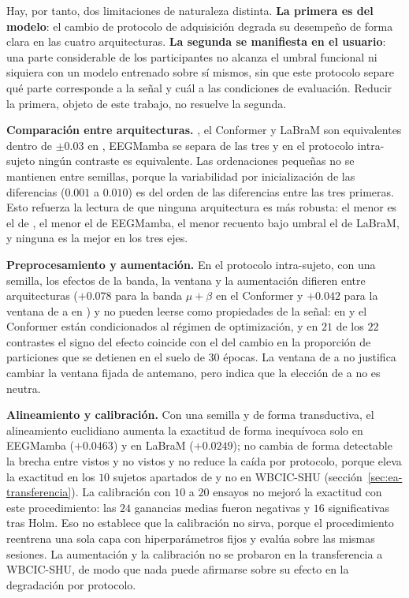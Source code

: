 Hay, por tanto, dos limitaciones de naturaleza distinta. \textbf{La primera es del modelo}: el cambio de
protocolo de adquisición degrada su desempeño de forma clara en las cuatro arquitecturas. \textbf{La segunda se
manifiesta en el usuario}: una parte considerable de los participantes no alcanza el umbral funcional ni
siquiera con un modelo entrenado sobre sí mismos, sin que este protocolo separe qué parte corresponde a la
señal y cuál a las condiciones de evaluación. Reducir la primera, objeto de este trabajo, no resuelve la
segunda.

\textbf{Comparación entre arquitecturas.} \eegnet{}, el Conformer y LaBraM son equivalentes dentro de $\pm 0.03$
en \loso{}, EEGMamba se separa de las tres y en el protocolo intra-sujeto ningún contraste es equivalente.
Las ordenaciones pequeñas no se mantienen entre semillas, porque la variabilidad por inicialización de las
diferencias ($0.001$ a $0.010$) es del orden de las diferencias entre las tres primeras. Esto refuerza la
lectura de que ninguna arquitectura es más robusta: el menor \dsi{} es el de \eegnet{}, el menor \idp{} el de
EEGMamba, el menor recuento bajo umbral el de LaBraM, y ninguna es la mejor en los tres ejes.

\textbf{Preprocesamiento y aumentación.} En el protocolo intra-sujeto, con una semilla, los efectos de la banda,
la ventana y la aumentación difieren entre arquitecturas ($+0.078$ para la banda $\mu+\beta$ en el Conformer y
$+0.042$ para la ventana de  a  en \eegnet{}) y no pueden leerse como propiedades de la señal:
en \eegnet{} y el Conformer están condicionados al régimen de optimización, y en $21$ de los $22$ contrastes el
signo del efecto coincide con el del cambio en la proporción de particiones que se detienen en el suelo de $30$
épocas. La ventana de  a  no justifica cambiar la ventana fijada de antemano, pero indica que la
elección de  a  no es neutra.

\textbf{Alineamiento y calibración.} Con una semilla y de forma transductiva, el alineamiento euclidiano
aumenta la exactitud \loso{} de forma inequívoca solo en EEGMamba ($+0.0463$) y en LaBraM ($+0.0249$); no
cambia de forma detectable la brecha entre vistos y no vistos y no reduce la caída por protocolo, porque eleva
la exactitud en los $10$ sujetos apartados de \openbmi{} y no en WBCIC-SHU (sección~\ref{sec:ea-transferencia}).
La calibración con $10$ a $20$ ensayos no mejoró la exactitud con este procedimiento: las $24$ ganancias medias
fueron negativas y $16$ significativas tras Holm. Eso no establece que la calibración no sirva, porque el
procedimiento reentrena una sola capa con hiperparámetros fijos y evalúa sobre las mismas sesiones. La
aumentación y la calibración no se probaron en la transferencia a WBCIC-SHU, de modo que nada puede afirmarse
sobre su efecto en la degradación por protocolo.

